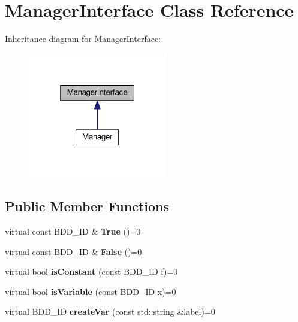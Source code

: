 \hypertarget{classManagerInterface}{}\section{Manager\+Interface Class Reference}
\label{classManagerInterface}


Inheritance diagram for Manager\+Interface\+:
\nopagebreak
\begin{figure}[H]
\begin{center}
\leavevmode
\includegraphics[width=172pt]{classManagerInterface__inherit__graph}
\end{center}
\end{figure}
\subsection*{Public Member Functions}
\begin{DoxyCompactItemize}
\item 
virtual const B\+D\+D\+\_\+\+ID \& {\bfseries True} ()=0\hypertarget{classManagerInterface_abb06c4fac2f82fd9fc920afb395e7530}{}\label{classManagerInterface_abb06c4fac2f82fd9fc920afb395e7530}

\item 
virtual const B\+D\+D\+\_\+\+ID \& {\bfseries False} ()=0\hypertarget{classManagerInterface_a8c5b3c1ebadc5c76e40e1648f5d459ca}{}\label{classManagerInterface_a8c5b3c1ebadc5c76e40e1648f5d459ca}

\item 
virtual bool {\bfseries is\+Constant} (const B\+D\+D\+\_\+\+ID f)=0\hypertarget{classManagerInterface_a44d4002c509fa7a1c82747113ca0a09a}{}\label{classManagerInterface_a44d4002c509fa7a1c82747113ca0a09a}

\item 
virtual bool {\bfseries is\+Variable} (const B\+D\+D\+\_\+\+ID x)=0\hypertarget{classManagerInterface_abed179c55a9e627784993ccfafca0841}{}\label{classManagerInterface_abed179c55a9e627784993ccfafca0841}

\item 
virtual B\+D\+D\+\_\+\+ID {\bfseries create\+Var} (const std\+::string \&label)=0\hypertarget{classManagerInterface_a594a44f1304270f150257cfd5f7aa103}{}\label{classManagerInterface_a594a44f1304270f150257cfd5f7aa103}

\end{DoxyCompactItemize}


